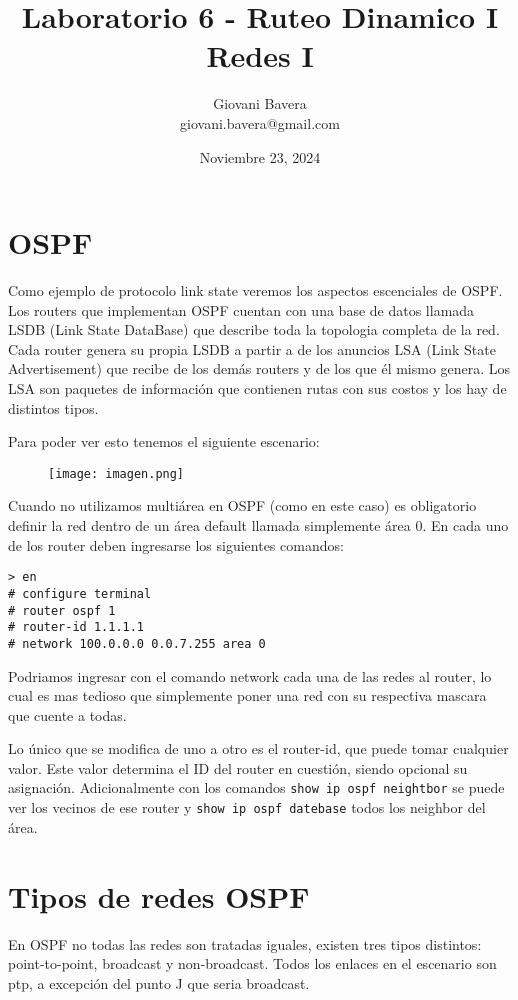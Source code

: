 \documentclass{article}
\title{Laboratorio 6 - Ruteo Dinamico I \\ Redes I}
\author{Giovani Bavera \\ giovani.bavera@gmail.com}
\date{Noviembre 23, 2024}
\begin{document}
\maketitle
\section{OSPF}

Como ejemplo de protocolo link state veremos los aspectos escenciales de OSPF. Los routers que implementan OSPF cuentan con una base de datos llamada LSDB (Link State DataBase) que describe toda la topologia completa de la red. Cada router genera su propia LSDB a partir a de los anuncios LSA (Link State Advertisement) que recibe de los demás routers y de los que él mismo genera. Los LSA son paquetes de información que contienen rutas con sus costos y los hay de distintos tipos.

Para poder ver esto tenemos el siguiente escenario: 

\begin{figure}[H]
    \centering
    \texttt{[image: imagen.png]}
\end{figure}

Cuando no utilizamos multiárea en OSPF (como en este caso) es obligatorio definir la red dentro de un área default llamada simplemente área 0. En cada uno de los router deben ingresarse los siguientes comandos:

\begin{verbatim}
> en
# configure terminal
# router ospf 1
# router-id 1.1.1.1
# network 100.0.0.0 0.0.7.255 area 0    
\end{verbatim}

Podriamos ingresar con el comando network cada una de las redes al router, lo cual es mas tedioso que simplemente poner una red con su respectiva mascara que cuente a todas. 

Lo único que se modifica de uno a otro es el router-id, que puede tomar cualquier valor. Este valor determina el ID del router en cuestión, siendo opcional su asignación. Adicionalmente con los comandos \texttt{show ip ospf neightbor} se puede ver los vecinos de ese router y \texttt{show ip ospf datebase} todos los neighbor del área.

\section{Tipos de redes OSPF}

En OSPF no todas las redes son tratadas iguales, existen tres tipos distintos: point-to-point, broadcast y non-broadcast. Todos los enlaces en el escenario son ptp, a excepción del punto J que seria broadcast. 
\end{document}
